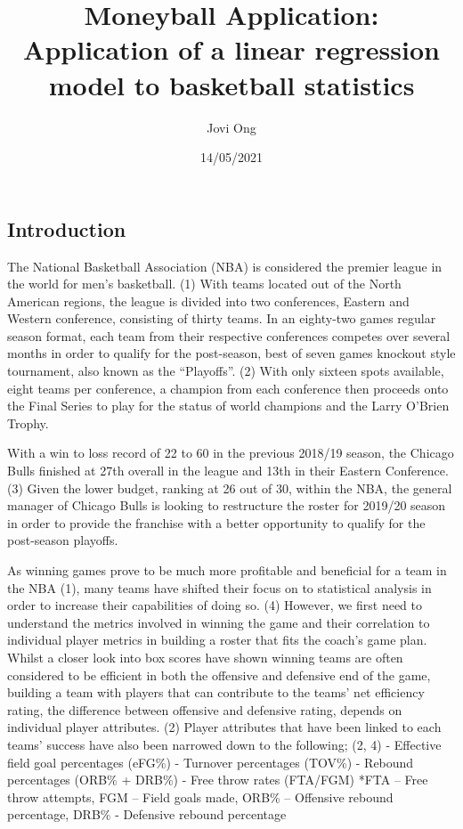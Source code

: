 \documentclass[
]{article}
\title{Moneyball Application: Application of a linear regression model
to basketball statistics}
\author{Jovi Ong}
\date{14/05/2021}
\begin{document}
\maketitle

\hypertarget{introduction}{%
\subsection{Introduction}\label{introduction}}

The National Basketball Association (NBA) is considered the premier
league in the world for men's basketball. (1) With teams located out of
the North American regions, the league is divided into two conferences,
Eastern and Western conference, consisting of thirty teams. In an
eighty-two games regular season format, each team from their respective
conferences competes over several months in order to qualify for the
post-season, best of seven games knockout style tournament, also known
as the ``Playoffs''. (2) With only sixteen spots available, eight teams
per conference, a champion from each conference then proceeds onto the
Final Series to play for the status of world champions and the Larry
O'Brien Trophy.

With a win to loss record of 22 to 60 in the previous 2018/19 season,
the Chicago Bulls finished at 27th overall in the league and 13th in
their Eastern Conference. (3) Given the lower budget, ranking at 26 out
of 30, within the NBA, the general manager of Chicago Bulls is looking
to restructure the roster for 2019/20 season in order to provide the
franchise with a better opportunity to qualify for the post-season
playoffs.

As winning games prove to be much more profitable and beneficial for a
team in the NBA (1), many teams have shifted their focus on to
statistical analysis in order to increase their capabilities of doing
so. (4) However, we first need to understand the metrics involved in
winning the game and their correlation to individual player metrics in
building a roster that fits the coach's game plan. Whilst a closer look
into box scores have shown winning teams are often considered to be
efficient in both the offensive and defensive end of the game, building
a team with players that can contribute to the teams' net efficiency
rating, the difference between offensive and defensive rating, depends
on individual player attributes. (2) Player attributes that have been
linked to each teams' success have also been narrowed down to the
following; (2, 4) - Effective field goal percentages (eFG\%) - Turnover
percentages (TOV\%) - Rebound percentages (ORB\% + DRB\%) - Free throw
rates (FTA/FGM) *FTA -- Free throw attempts, FGM -- Field goals made,
ORB\% -- Offensive rebound percentage, DRB\% - Defensive rebound
percentage
\end{document}
